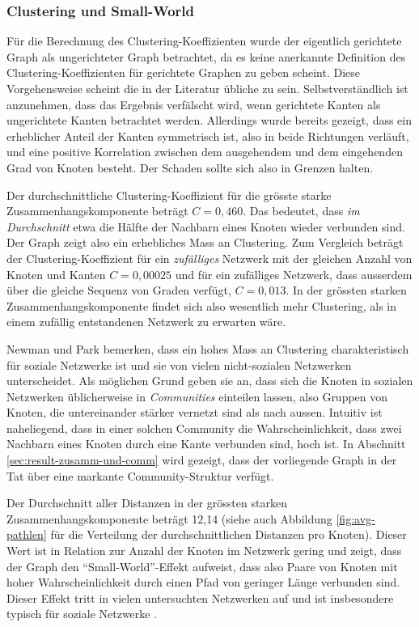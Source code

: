 \subsubsection{Clustering und Small-World}
\label{sec:clustering-und-small}

F\"ur die Berechnung des Clustering-Koeffizienten wurde der eigentlich
gerichtete Graph als ungerichteter Graph betrachtet, da es keine
anerkannte Definition des Clustering-Koeffizienten f\"ur gerichtete
Graphen zu geben scheint. Diese Vorgehensweise scheint die in der
Literatur \"ubliche zu sein. Selbstverst\"andlich ist anzunehmen, dass
das Ergebnis verf\"alscht wird, wenn gerichtete Kanten als
ungerichtete Kanten betrachtet werden. Allerdings wurde bereits
gezeigt, dass ein erheblicher Anteil der Kanten symmetrisch ist, also
in beide Richtungen verl\"auft, und eine positive Korrelation zwischen
dem ausgehendem und dem eingehenden Grad von Knoten besteht. Der
Schaden sollte sich also in Grenzen halten.

Der durchschnittliche Clustering-Koeffizient f\"ur die gr\"osste
starke Zusammenhangskomponente betr\"agt $C = 0,460$. Das bedeutet,
dass \emph{im Durchschnitt} etwa die H\"alfte der Nachbarn eines
Knoten wieder verbunden sind. Der Graph zeigt also ein erhebliches
Mass an Clustering. Zum Vergleich betr\"agt der Clustering-Koeffizient
f\"ur ein \emph{zuf\"alliges} Netzwerk mit der gleichen Anzahl von
Knoten und Kanten $C = 0,00025$ und f\"ur ein zuf\"alliges Netzwerk,
dass ausserdem \"uber die gleiche Sequenz von Graden verf\"ugt, $C =
0,013$. In der gr\"ossten starken Zusammenhangskomponente findet sich
also wesentlich mehr Clustering, als in einem zuf\"allig entstandenen
Netzwerk zu erwarten w\"are.

Newman und Park bemerken, dass ein hohes Mass an Clustering
charakteristisch f\"ur soziale Netzwerke ist und sie von vielen
nicht-sozialen Netzwerken unterscheidet\cite{PhysRevE.68.036122}. Als
m\"oglichen Grund geben sie an, dass sich die Knoten in sozialen
Netzwerken \"ublicherweise in \emph{Communities} einteilen lassen,
also Gruppen von Knoten, die untereinander st\"arker vernetzt sind als
nach aussen. Intuitiv ist naheliegend, dass in einer solchen Community
die Wahrscheinlichkeit, dass zwei Nachbarn eines Knoten durch eine
Kante verbunden sind, hoch ist. In Abschnitt
\ref{sec:result-zusamm-und-comm} wird gezeigt, dass der vorliegende
Graph in der Tat \"uber eine markante Community-Struktur verf\"ugt.

Der Durchschnitt aller Distanzen in der gr\"ossten starken
Zusammenhangskomponente betr\"agt 12,14 (siehe auch Abbildung
\ref{fig:avg-pathlen} f\"ur die Verteilung der durchschnittlichen
Distanzen pro Knoten). Dieser Wert ist in Relation zur Anzahl der
Knoten im Netzwerk gering und zeigt, dass der Graph den
``Small-World''-Effekt aufweist, dass also Paare von Knoten mit
hoher Wahrscheinlichkeit durch einen Pfad von geringer L\"ange
verbunden sind. Dieser Effekt tritt in vielen untersuchten Netzwerken
auf und ist insbesondere typisch f\"ur soziale Netzwerke
\cite{newman:167}.

